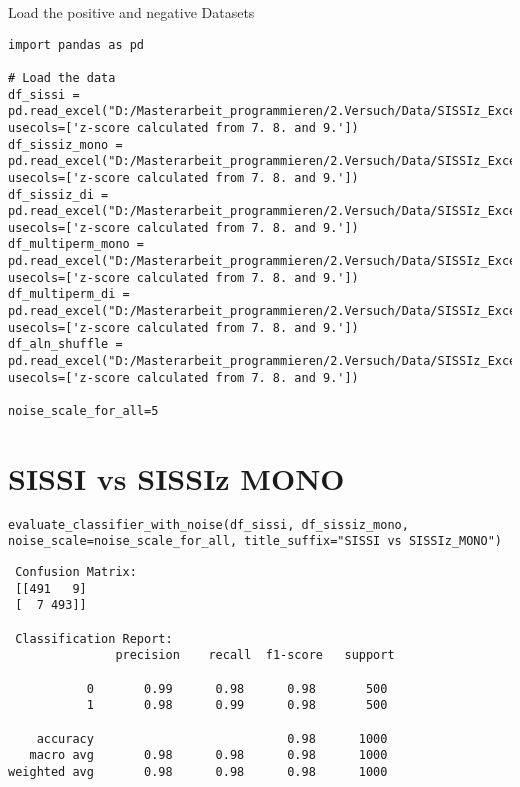 \documentclass{article}
\begin{document}
\begin{large}
\begin{large}
\begin{large}
Load the positive and negative Datasets
\begin{lstlisting}
import pandas as pd

# Load the data
df_sissi = pd.read_excel("D:/Masterarbeit_programmieren/2.Versuch/Data/SISSIz_Excel/sissi.xlsx", usecols=['z-score calculated from 7. 8. and 9.'])
df_sissiz_mono = pd.read_excel("D:/Masterarbeit_programmieren/2.Versuch/Data/SISSIz_Excel/sissiz_mono.xlsx", usecols=['z-score calculated from 7. 8. and 9.'])
df_sissiz_di = pd.read_excel("D:/Masterarbeit_programmieren/2.Versuch/Data/SISSIz_Excel/sissiz_di.xlsx", usecols=['z-score calculated from 7. 8. and 9.'])
df_multiperm_mono = pd.read_excel("D:/Masterarbeit_programmieren/2.Versuch/Data/SISSIz_Excel/multiperm_mono.xlsx", usecols=['z-score calculated from 7. 8. and 9.'])
df_multiperm_di = pd.read_excel("D:/Masterarbeit_programmieren/2.Versuch/Data/SISSIz_Excel/multiperm_di.xlsx", usecols=['z-score calculated from 7. 8. and 9.'])
df_aln_shuffle = pd.read_excel("D:/Masterarbeit_programmieren/2.Versuch/Data/SISSIz_Excel/alifoldz.xlsx", usecols=['z-score calculated from 7. 8. and 9.'])

noise_scale_for_all=5
\end{lstlisting}\par
\vspace{1em}

\clearpage

\section{SISSI vs SISSIz MONO}

\begin{lstlisting}
evaluate_classifier_with_noise(df_sissi, df_sissiz_mono, noise_scale=noise_scale_for_all, title_suffix="SISSI vs SISSIz_MONO")
\end{lstlisting}\par


\begin{lstlisting}
 Confusion Matrix:
 [[491   9]
 [  7 493]]

 Classification Report:
               precision    recall  f1-score   support

           0       0.99      0.98      0.98       500
           1       0.98      0.99      0.98       500

    accuracy                           0.98      1000
   macro avg       0.98      0.98      0.98      1000
weighted avg       0.98      0.98      0.98      1000
\end{lstlisting}\par


\end{large}
\end{large}
\end{large}
\end{document}
